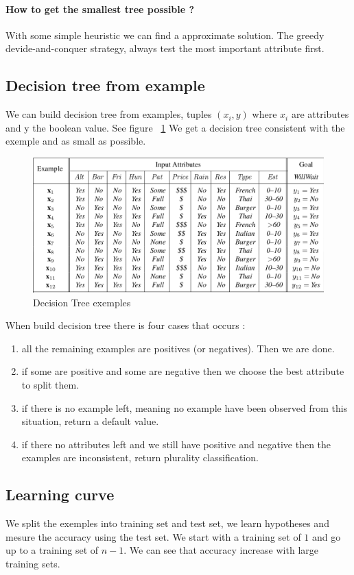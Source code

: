 \paragraph{How to get the smallest tree possible ?}
With some simple heuristic we can find a approximate solution. The greedy devide-and-conquer strategy, always test the most important
attribute first.

\subsection{Decision tree from example}
We can build decision tree from examples, tuples $(x_i,y)$ where $x_i$ are attributes and y the boolean value. See figure ~\ref{decisionTreeFromEx}
We get a decision tree consistent with the exemple and as small as possible.

\begin{figure}[h]
    \centering
    \includegraphics[width=14cm]{decisionTreeEx.png}
    \caption{Decision Tree exemples}
    \label{decisionTreeFromEx} 
\end{figure}

When build decision tree there is four cases that occurs :
\begin{enumerate}
\item all the remaining examples are positives (or negatives). Then we are done.
\item if some are positive and some are negative then we choose the best attribute to split them.
\item if there is no example left, meaning no example have been observed from this situation, return a default value.
\item if there no attributes left and we still have positive and negative then the examples are inconsistent, return plurality classification.
\end{enumerate}

\subsection{Learning curve}
We split the exemples into training set and test set, we learn hypotheses and mesure the accuracy using the test set. 
We start with a training set of $1$ and go up to a training set of $n-1$. We can see that accuracy increase with large training sets.

